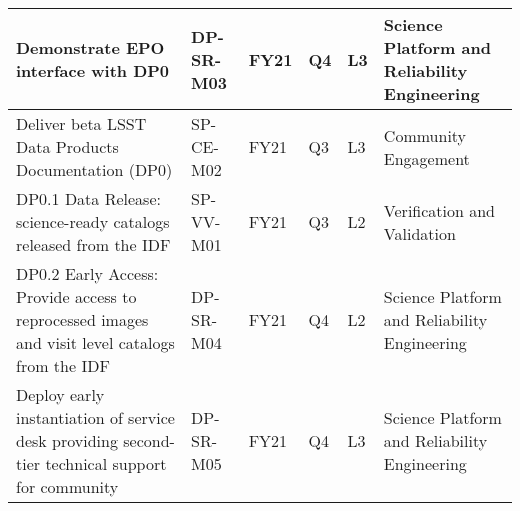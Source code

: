 \begin{longtable} {|p{}|l|l|l|l|l|}
{Demonstrate EPO interface with DP0}&{DP-SR-M03}&{FY21}&{Q4}&{L3}&{Science Platform and Reliability Engineering} \\ \hline
{Deliver beta LSST Data Products Documentation (DP0)}&{SP-CE-M02}&{FY21}&{Q3}&{L3}&{Community Engagement} \\ \hline
{DP0.1 Data Release: science-ready catalogs released from the IDF}&{SP-VV-M01}&{FY21}&{Q3}&{L2}&{Verification and Validation} \\ \hline
{DP0.2 Early Access: Provide access to reprocessed images and visit level catalogs from the IDF}&{DP-SR-M04}&{FY21}&{Q4}&{L2}&{Science Platform and Reliability Engineering} \\ \hline
{Deploy early instantiation of service desk providing second-tier technical support for community}&{DP-SR-M05}&{FY21}&{Q4}&{L3}&{Science Platform and Reliability Engineering} \\ \hline
\end{longtable} \normalsize
